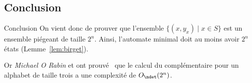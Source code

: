 \subsection{Conclusion}

\begin{frame}{\myframetitle}
  \begin{block}{Conclusion}
    On vient donc de prouver que l'ensemble \(\{(x, y_x) \mid x \in S\}\) est
    un ensemble piégeant de taille \(2^n\). Ainsi, l'automate minimal doit au
    moins avoir \(2^n\) états (Lemme~\ref{lem:birget}).

     {
      \vphantom{}

      Or \textit{Michael O Rabin} et  ont
      prouvé~\cite{RS1959} que le calcul du complémentaire pour un alphabet de
      taille trois a une complexité de \(O_{\ndet}(2^n)\).
    }
  \end{block}
\end{frame}